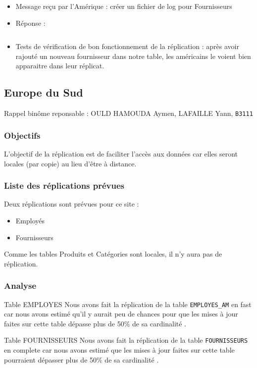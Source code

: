 \documentclass[10pt,a4paper]{article}
\theoremstyle{plain}
\begin{document}
\begin{itemize}
    \item Message reçu par l'Amérique : créer un fichier de log pour Fournisseurs
    \item Réponse : 
    
\inputminted{sql}{INSA-DB12-EuropeNord-rep-eu-n.sql}
    
    \item Tests de vérification de bon fonctionnement de la réplication : après avoir  rajouté un nouveau fournisseur dans notre table, les américains le voient bien apparaitre dans leur réplicat.
\end{itemize}


\newpage

\subsection{Europe du Sud}
Rappel binôme reponsable : OULD HAMOUDA Aymen, LAFAILLE Yann, \verb|B3111|

\subsubsection{Objectifs}
L’objectif de la réplication est de faciliter l’accès aux données car elles seront locales (par copie) au lieu d'être à distance.


\subsubsection{Liste des réplications prévues}
Deux réplications sont prévues pour ce site :
\begin{itemize}
    \item Employés
    \item Fournisseurs
\end{itemize}
Comme les tables Produits et Catégories sont locales, il n'y aura pas de réplication.

\subsubsection{Analyse}
Table EMPLOYES
Nous avons fait la réplication de la table \verb|EMPLOYES_AM| en fast  car nous avons estimé qu’il y aurait peu de chances pour que les mises à jour faites sur cette table dépasse plus de 50\% de sa cardinalité .

Table FOURNISSEURS
Nous avons fait la réplication de la table \verb|FOURNISSEURS| en complete car nous avons estimé que les mises à jour faites sur cette table pourraient dépasser plus de 50\% de sa cardinalité .
\end{document}
